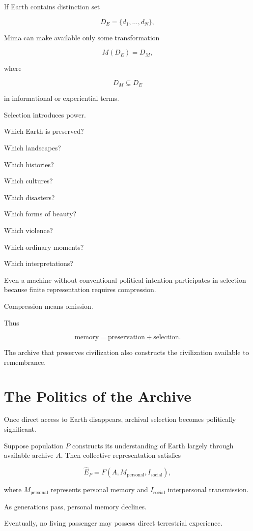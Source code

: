 \documentclass[11pt,oneside]{book}
\theoremstyle{definition}
\theoremstyle{remark}
\begin{document}
If Earth contains distinction set

\[
D_E
=
\{d_1,\ldots,d_N\},
\]

Mima can make available only some transformation

\[
M(D_E)
=
D_M,
\]

where

\[
D_M\subsetneq D_E
\]

in informational or experiential terms.

Selection introduces power.

Which Earth is preserved?

Which landscapes?

Which histories?

Which cultures?

Which disasters?

Which forms of beauty?

Which violence?

Which ordinary moments?

Which interpretations?

Even a machine without conventional political intention participates in selection because finite representation requires compression.

Compression means omission.

Thus

\[
\text{memory}
=
\text{preservation}
+
\text{selection}.
\]

The archive that preserves civilization also constructs the civilization available to remembrance.

\section{The Politics of the Archive}

Once direct access to Earth disappears, archival selection becomes politically significant.

Suppose population \(P\) constructs its understanding of Earth largely through available archive \(A\). Then collective representation satisfies

\[
\widehat E_P
=
F(A,M_{\mathrm{personal}},I_{\mathrm{social}}),
\]

where \(M_{\mathrm{personal}}\) represents personal memory and \(I_{\mathrm{social}}\) interpersonal transmission.

As generations pass, personal memory declines.

Eventually, no living passenger may possess direct terrestrial experience.
\end{document}
